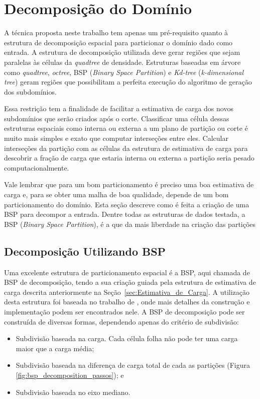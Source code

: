 \section{Decomposição do Domínio}\label{sec:Decomposicao_dominio}

A técnica proposta neste trabalho tem apenas um pré-requisito quanto à estrutura de decomposição espacial para particionar o domínio dado como entrada. A estrutura de decomposição utilizada deve gerar regiões que sejam paralelas às células da \textit{quadtree} de densidade. Estruturas baseadas em árvore como \textit{quadtree}, \textit{octree}, BSP (\textit{Binary Space Partition}) e \textit{Kd-tree} (\textit{k-dimensional tree}) geram regiões que possibilitam a perfeita execução do algoritmo de geração dos subdomínios.

Essa restrição tem a finalidade de facilitar a estimativa de carga dos novos subdomínios que serão criados após o corte. Classificar uma célula dessas estruturas espaciais como interna ou externa a um plano de partição ou corte é muito mais simples e exato que computar interseções entre eles. Calcular interseções da partição com as células da estrutura de estimativa de carga para descobrir a fração de carga que estaria interna ou externa a partição seria pesado computacionalmente.

Vale lembrar que para um bom particionamento é preciso uma boa estimativa de carga e, para se obter uma malha de boa qualidade, depende de um bom particionamento do domínio. Esta seção descreve como é feita a criação de uma BSP para decompor a entrada. Dentre todas as estruturas de dados testada, a BSP (\textit{Binary Space Partition}), é a que da mais liberdade na criação das partições


\subsection{Decomposição Utilizando BSP}

Uma excelente estrutura de particionamento espacial é a BSP, aqui chamada de BSP de decomposição, tendo a sua criação guiada pela estrutura de estimativa de carga descrita anteriormente na Seção~\ref{sec:Estimativa_de_Carga}. A utilização desta estrutura foi baseada no trabalho de \cite{bib:RepMarkos13}, onde mais detalhes da construção e implementação podem ser encontrados nele. A BSP de decomposição pode ser construída de diversas formas, dependendo apenas do critério de subdivisão:


\begin{itemize}
	\item Subdivisão baseada na carga. Cada célula folha não pode ter uma carga maior que a carga média;
	\item Subdivisão baseada na diferença de carga total de cada as partições (Figura \ref{fig:bsp_decomposition_passos}); e 
	\item Subdivisão baseada no eixo mediano.
\end{itemize}


